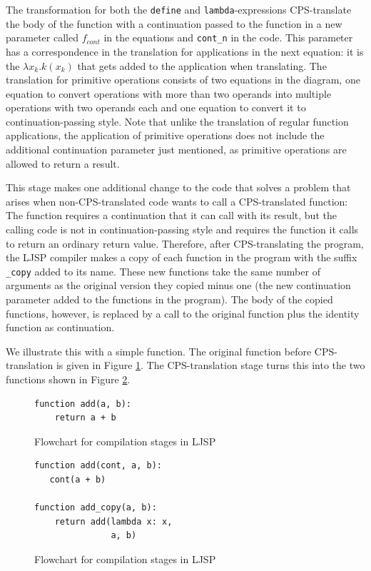 \documentclass[11pt]{report}
\begin{document}
The transformation for both the \texttt{define} and \texttt{lambda}-expressions CPS-translate the body of the function with a continuation passed to the function in a new parameter called $f_{cont}$ in the equations and \texttt{cont_n} in the code. This parameter has a correspondence in the translation for applications in the next equation: it is the $\lambda x_k.k(x_k)$ that gets added to the application when translating. The translation for primitive operations consists of two equations in the diagram, one equation to convert operations with more than two operands into multiple operations with two operands each and one equation to convert it to continuation-passing style. Note that unlike the translation of regular function applications, the application of primitive operations does not include the additional continuation parameter just mentioned, as primitive operations are allowed to return a result.

This stage makes one additional change to the code that solves a problem that arises when non-CPS-translated code wants to call a CPS-translated function: The function requires a continuation that it can call with its result, but the calling code is not in continuation-passing style and requires the function it calls to return an ordinary return value. Therefore, after CPS-translating the program, the LJSP compiler makes a copy of each function in the program with the suffix \texttt{_copy} added to its name. These new functions take the same number of arguments as the original version they copied minus one (the new continuation parameter added to the functions in the program). The body of the copied functions, however, is replaced by a call to the original function plus the identity function as continuation. 

We illustrate this with a simple function. The original function before CPS-translation is given in Figure \ref{cpsdetail1}. The CPS-translation stage turns this into the two functions shown in Figure \ref{cpsdetail2}.

\begin{figure}[ht]
\begin{lstlisting}
function add(a, b):
    return a + b
\end{lstlisting}
\caption{Flowchart for compilation stages in LJSP}
\label{cpsdetail1}
\end{figure}

\begin{figure}[ht]
\begin{lstlisting}
function add(cont, a, b):
   cont(a + b)
   
function add_copy(a, b):
    return add(lambda x: x, 
               a, b)
\end{lstlisting}
\caption{Flowchart for compilation stages in LJSP}
\label{cpsdetail2}
\end{figure}
\end{document}
